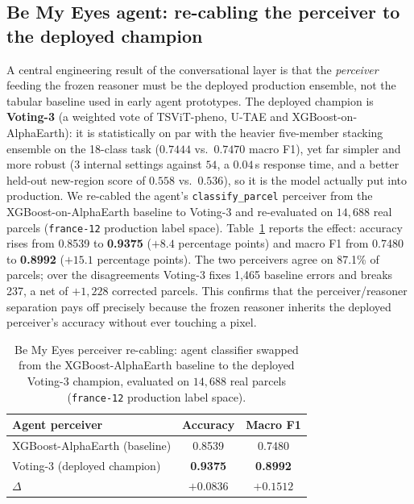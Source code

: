 \subsection{Be My Eyes agent: re-cabling the perceiver to the deployed champion}
\label{sec:results-perceiver}
A central engineering result of the conversational layer is that the
\emph{perceiver} feeding the frozen reasoner must be the deployed
production ensemble, not the tabular baseline used in early agent
prototypes. The deployed champion is \textbf{Voting-3} (a weighted vote of
TSViT-pheno, U-TAE and XGBoost-on-AlphaEarth): it is statistically on par
with the heavier five-member stacking ensemble on the 18-class task
($0.7444$ vs.\ $0.7470$ macro F1), yet far simpler and more robust ($3$
internal settings against $54$, a $0.04$\,s response time, and a better
held-out new-region score of $0.558$ vs.\ $0.536$), so it is the model
actually put into production. We re-cabled the agent's
\texttt{classify\_parcel} perceiver from the XGBoost-on-AlphaEarth
baseline to Voting-3 and re-evaluated on $14{,}688$ real parcels
(\texttt{france-12} production label space). Table~\ref{tab:perceiver}
reports the effect: accuracy rises from 0.8539 to \textbf{0.9375}
($+8.4$ percentage points) and macro F1 from 0.7480 to
\textbf{0.8992} ($+15.1$ percentage points). The two perceivers agree
on 87.1\% of parcels; over the disagreements Voting-3 fixes
1{,}465 baseline errors and breaks 237, a net of
$+1{,}228$ corrected parcels. This confirms that the perceiver/reasoner
separation pays off precisely because the frozen reasoner inherits the
deployed perceiver's accuracy without ever touching a pixel.

\begin{table}[htbp]
\caption{Be My Eyes perceiver re-cabling: agent classifier swapped from
the XGBoost-AlphaEarth baseline to the deployed Voting-3 champion,
evaluated on $14{,}688$ real parcels (\texttt{france-12} production label
space).}
\label{tab:perceiver}
\centering
\begin{tabular}{lcc}
\toprule
\textbf{Agent perceiver} & \textbf{Accuracy} & \textbf{Macro F1} \\
\midrule
XGBoost-AlphaEarth (baseline) & 0.8539 & 0.7480 \\
Voting-3 (deployed champion)  & \textbf{0.9375} & \textbf{0.8992} \\
$\Delta$                      & $+0.0836$ & $+0.1512$ \\
\bottomrule
\end{tabular}
\end{table}

